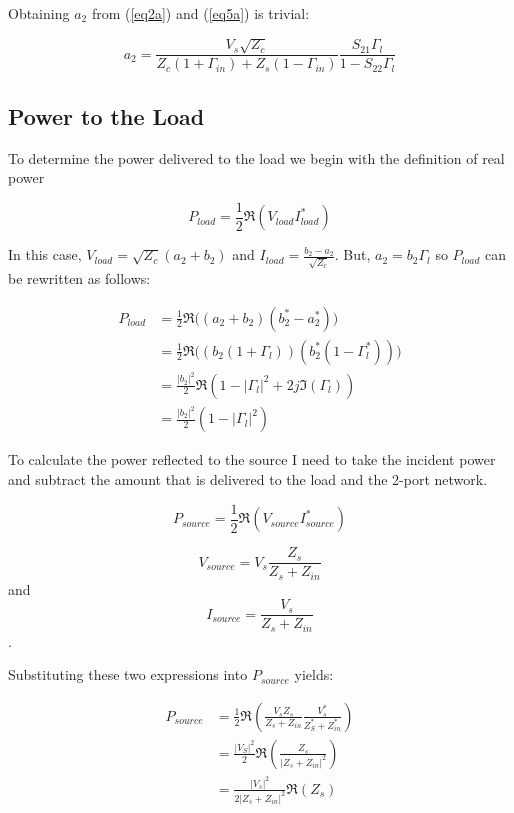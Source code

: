 Obtaining $a_2$ from (\ref{eq2a}) and (\ref{eq5a}) is trivial:

\begin{equation}
    a_2 = \frac{V_s \sqrt{Z_c}}{Z_c \left( 1+\Gamma_{in} \right) +
    Z_s(1-\Gamma_{in})}\frac{S_{21}\Gamma_l}{1-S_{22}\Gamma_l} \label{a2}
\end{equation}
\subsection*{Power to the Load}
To determine the power delivered to the load we begin with the definition of
real power

\[ 
        P_{load} =  \frac{1}{2}\Re\left( V_{load}I^*_{load} \right) 
\]

In this case, $V_{load} = \sqrt{Z_c} \left( a_2 + b_2 \right) $ and $I_{load} =
\frac{b_2-a_2}{\sqrt{Z_c}}$. But, $a_2 = b_2 \Gamma_l$ so $P_{load}$ can be
rewritten as follows:

\begin{align*}
    P_{load} &= \frac{1}{2}\Re\Big( \left( a_2+b_2 \right)\left( b_2^*-a_2^*
    \right)\Big) \\
    &= \frac{1}{2}\Re\Big( \left( b_2 \left( 1+\Gamma_l \right) \right)\left(
    b_2^* \left( 1-\Gamma_l^* \right) \right)\Big) \\
    &= \frac{\left| b_2 \right|^2 }{2}\Re \left( 1- \left| \Gamma_l \right|^2 + 2j
\Im(\Gamma_l) \right) \\ 
    &= \frac{\left| b_2 \right|^2 }{2} \left( 1- \left| \Gamma_l \right|^2 \right)
\end{align*}

To calculate the power reflected to the source I need to take the incident power
and subtract the amount that is delivered to the load and the 2-port network.

\[ 
        P_{source} = \frac{1}{2}\Re \left( V_{source}I^*_{source} \right) 
\]

$$V_{source} = V_s \frac{Z_s}{Z_s+Z_{in}}$$ and $$I_{source} =\frac{V_s}{Z_s +
Z_{in}}$$.

Substituting these two expressions into $P_{source}$ yields:

\begin{align*}
    P_{source} &= \frac{1}{2} \Re \left( \frac{V_s Z_s}{Z_s + Z_{in}}
\frac{V_s^*}{Z_S^* + Z_{in}^*} \right) \\
&= \frac{\left| V_S \right|^2}{2} \Re \left( \frac{Z_s}{|Z_s+Z_{in}|^2} \right)
\\
&= \frac{\left| V_s \right|^2}{2 \left| Z_s + Z_{in} \right|^2} \Re(Z_s)
\end{align*}

